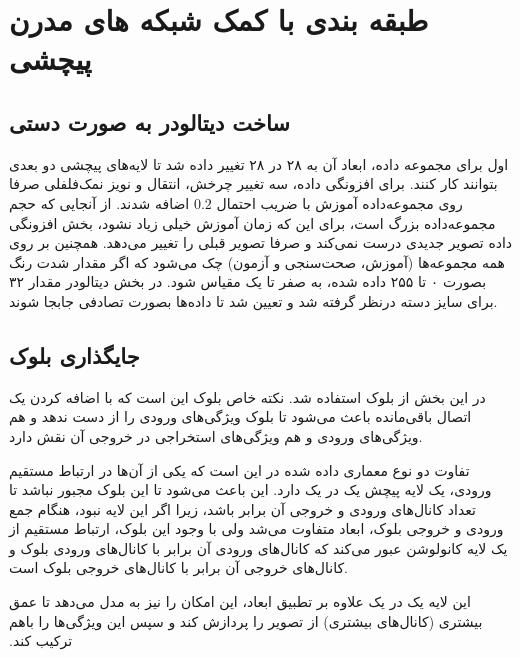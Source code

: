 
\def \Subject {طبقه بندی با کمک شبکه های مدرن پیچشی }
\def \Session { دو}
\renewcommand{\chaptername}{سوال}
\chapter{\Subject}

\section{ ساخت دیتالودر به صورت دستی}

 اول برای مجموعه داده، 
ابعاد آن به ۲۸ در ۲۸ تغییر داده شد تا لایه‌های پیچشی دو بعدی 
بتوانند کار کنند. برای افزونگی داده، سه تغییر چرخش، انتقال و 
نویز نمک‌فلفلی
صرفا روی مجموعه‌داده آموزش با ضریب احتمال $0.2$ اضافه شدند. از آنجایی که حجم مجموعه‌داده بزرگ است، برای این که زمان آموزش خیلی زیاد نشود، بخش افزونگی داده تصویر جدیدی درست نمی‌کند و صرفا تصویر قبلی را تغییر می‌دهد. همچنین بر روی همه مجموعه‌ها (آموزش، صحت‌سنجی و آزمون) چک می‌شود که اگر مقدار شدت رنگ بصورت ۰ تا ۲۵۵ داده شده، به صفر تا یک مقیاس 
شود. در بخش 
 دیتالودر
مقدار ۳۲ برای سایز دسته
درنظر گرفته شد و تعیین شد تا داده‌‌ها بصورت تصادفی جابجا شوند.


\section{
جایگذاری بلوک 
}

در این بخش از 
بلوک 
استفاده شد. نکته خاص بلوک 
این است که با اضافه کردن یک اتصال باقی‌مانده 
باعث می‌شود تا بلوک ویژگی‌های ورودی را از دست ندهد و هم ویژگی‌های ورودی و هم ویژگی‌های استخراجی در خروجی آن نقش دارد.

تفاوت دو نوع معماری داده شده در این است که یکی از آن‌ها در ارتباط مستقیم ورودی، یک لایه پیچش یک در یک دارد. این باعث می‌شود تا این بلوک مجبور نباشد تا تعداد کانال‌های ورودی و خروجی آن برابر باشد، زیرا اگر این لایه نبود، هنگام جمع ورودی و خروجی بلوک، ابعاد متفاوت می‌شد ولی با وجود این بلوک، ارتباط مستقیم از یک لایه کانولوشن عبور می‌کند که کانال‌های ورودی آن برابر با کانال‌های ورودی بلوک و کانال‌های خروجی آن برابر با کانال‌های خروجی بلوک است. 

این لایه یک در یک علاوه بر تطبیق ابعاد، این امکان را نیز به مدل می‌دهد تا عمق بیشتری (کانال‌های بیشتری) ‫‫‫از تصویر را پردازش کند و سپس این ویژگی‌ها را باهم ترکیب کند. 

